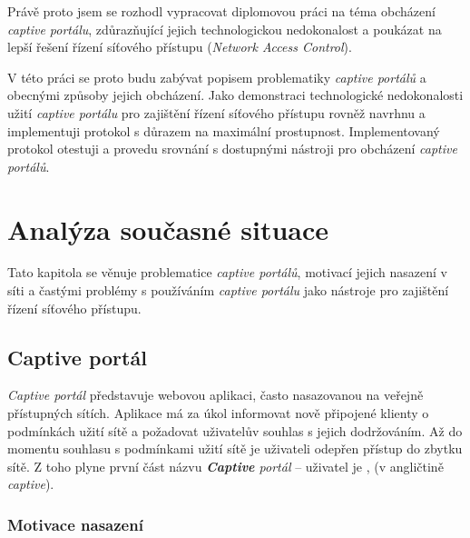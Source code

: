 \documentclass[thesis=M,czech]{FITthesis}[2012/10/20]
\begin{document}
\begin{introduction}
Právě proto jsem se rozhodl vypracovat diplomovou práci na téma obcházení \textit{captive portálu}, zdůrazňující jejich technologickou nedokonalost a poukázat na lepší řešení řízení síťového přístupu (\textit{Network Access Control}).

V této práci se proto budu zabývat popisem problematiky \textit{captive portálů} a obecnými způsoby jejich obcházení. Jako demonstraci technologické nedokonalosti užití \textit{captive portálu} pro zajištění řízení síťového přístupu rovněž navrhnu a implementuji protokol s důrazem na maximální prostupnost. Implementovaný protokol otestuji a provedu srovnání s dostupnými nástroji pro obcházení \textit{captive portálů}.
\end{introduction}

\chapter{Analýza současné situace}

Tato kapitola se věnuje problematice \textit{captive portálů}, motivací jejich nasazení v síti a častými problémy s používáním \textit{captive portálu} jako nástroje pro zajištění řízení síťového přístupu.

\section{Captive portál}

\textit{Captive portál} představuje webovou aplikaci, často nasazovanou na veřejně přístupných sítích. Aplikace má za úkol informovat nově připojené klienty o podmínkách užití sítě a požadovat uživatelův souhlas s jejich dodržováním. Až do momentu souhlasu s podmínkami užití sítě je uživateli odepřen přístup do zbytku sítě. Z toho plyne první část názvu \textit{\textbf{Captive} portál} -- uživatel je ,  (v angličtině \textit{captive}).

\subsection{Motivace nasazení}

\end{document}
